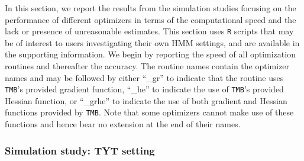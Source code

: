 \documentclass[]{interact}\usepackage[]{graphicx}\usepackage[dvipsnames]{xcolor}
\theoremstyle{plain}%
\theoremstyle{definition}
\theoremstyle{remark}
\begin{document}

In this section, we report the results from the simulation studies focusing on the performance of different optimizers in terms of the computational speed and the lack or presence of unreasonable estimates.
This section uses {\tt{R}} scripts that may be of interest to users investigating their own HMM settings, and are available in the supporting information.
We begin by reporting the speed of all optimization routines and thereafter the accuracy. 
The routine names contain the optimizer names and may be followed by either ``\_gr'' to indicate that the routine uses {\tt{TMB}}'s provided gradient function, ``\_he'' to indicate the use of {\tt{TMB}}'s provided Hessian function, or ``\_grhe'' to indicate the use of both gradient and Hessian functions provided by {\tt{TMB}}.
Note that some optimizers cannot make use of these functions and hence bear no extension at the end of their names.



\subsubsection{Simulation study: TYT setting}
\label{sec:results-tinn}
\end{document}
